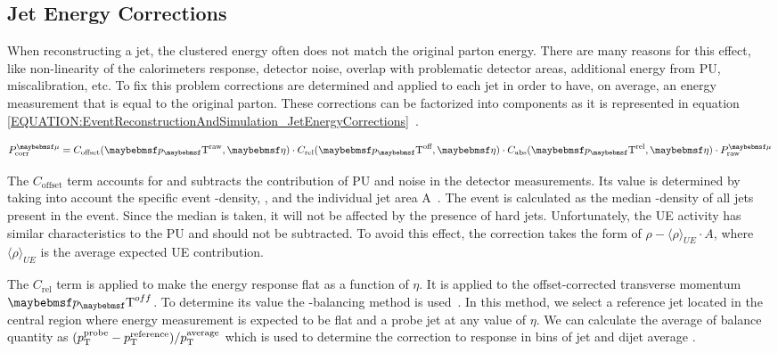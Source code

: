 \subsection{Jet Energy Corrections}
\label{SECTION:EventReconstructionAndSimulation_Jets_JetEnergyCorrections}


When reconstructing a jet, the clustered energy often does not match the original parton energy. There are many reasons for this effect, like non-linearity of the calorimeters response, detector noise, overlap with problematic detector areas, additional energy from \gls{PU}, miscalibration, etc. To fix this problem corrections are determined and applied to each jet in order to have, on average, an energy measurement that is equal to the original parton. These corrections can be factorized into components as it is represented in equation \ref{EQUATION:EventReconstructionAndSimulation_JetEnergyCorrections}~\cite{ARTICLE:CMSDeterminationJetEnergyCalibration}.

\begin{equation}
P_{\text{corr}}^{\mu} = C_{\text{offset}}(\pT^{\text{raw}},\eta) \cdot C_{\text{rel}}(\pT^{\text{off}},\eta) \cdot C_{\text{abs}}(\pT^{\text{rel}},\eta) \cdot P_{\text{raw}}^{\mu}
\label{EQUATION:EventReconstructionAndSimulation_JetEnergyCorrections}
\end{equation}

The $C_{\text{offset}}$ term accounts for and subtracts the contribution of \gls{PU} and noise in the detector measurements. Its value is determined by taking into account the specific event \pt-density, \rho, and the individual jet area A~\cite{ARTICLE:PileupSubtractionJetAreas}. The event \rho is calculated as the median \pt-density of all jets present in the event. Since the median is taken, it will not be affected by the presence of hard jets. Unfortunately, the \gls{UE} activity has similar characteristics to the \gls{PU} and should not be subtracted. To avoid this effect, the correction takes the form of $\rho - \langle \rho \rangle_{UE} \cdot A$, where $\langle \rho \rangle_{UE}$ is the average expected \gls{UE} contribution.

The $C_{\text{rel}}$ term is applied to make the energy response flat as a function of $\eta$. It is applied to the offset-corrected transverse momentum $\pT^{off}$. To determine its value the \pt-balancing method is used~\cite{ARTICLE:CMSDeterminationJetEnergyCalibration}. In this method, we select a reference jet located in the central region where energy measurement is expected to be flat and a probe jet at any value of $\eta$. We can calculate the average of balance quantity as $(p_{\mathrm{T}}^{\text{probe}} - p_{\mathrm{T}}^{\text{reference}} ) / p_{\mathrm{T}}^{\text{average}}$ which is used to determine the correction to response in bins of jet \eta and dijet average \pt. 

